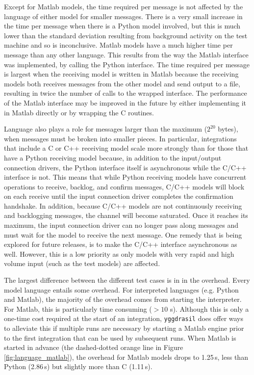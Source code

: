 \documentclass[journal]{IEEEtran}
\newcommand{\pkg}{{\tt yggdrasil}{}}
\begin{document}
Except for Matlab models, the time required per message is not affected by the language of either model for smaller messages. There is a very small increase in the time per message when there is a Python model involved, but this is much lower than the standard deviation resulting from background activity on the test machine and so is inconclusive. Matlab models have a much higher time per message than any other language. This results from the way the Matlab interface was implemented, by calling the Python interface. The time required per message is largest when the receiving model is written in Matlab because the receiving models both receives messages from the other model and send output to a file, resulting in twice the number of calls to the wrapped interface. The performance of the Matlab interface may be improved in the future by either implementing it in Matlab directly or by wrapping the C routines.

Language also plays a role for messages larger than the maximum ($2^{20}$ bytes), when messages must be broken into smaller pieces. In particular, integrations that include a C or C++ receiving model scale more strongly than for those that have a Python receiving model because, in addition to the input/output connection drivers, the Python interface itself is asynchronous while the C/C++ interface is not. This means that while Python receiving models have concurrent operations to receive, backlog, and confirm messages, C/C++ models will block on each receive until the input connection driver completes the confirmation handshake. In addition, because C/C++ models are not continuously receiving and backlogging messages, the channel will become saturated. Once it reaches its maximum, the input connection driver can no longer pass along messages and must wait for the model to receive the next message. One remedy that is being explored for future releases, is to make the C/C++ interface asynchronous as well. However, this is a low priority as only models with very rapid and high volume input (such as the test models) are affected.

The largest difference between the different test cases is in in the overhead. Every model language entails some overhead. For interpreted languages (e.g. Python and Matlab), the majority of the overhead comes from starting the interpreter. For Matlab, this is particularly time consuming ($>10$ s). Although this is only a one-time cost required at the start of an integration, {\pkg} does offer ways to alleviate this if multiple runs are necessary by starting a Matlab engine prior to the first integration that can be used by subsequent runs. When Matlab is started in advance (the dashed-dotted orange line in Figure \ref{fig:language_matlab}), the overhead for Matlab models drops to 1.25\,s, less than Python (2.86\,s) but slightly more than C (1.11\,s).
\end{document}
